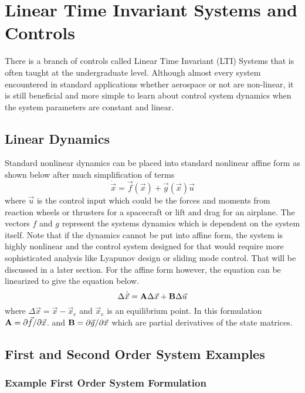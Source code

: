 \section{Linear Time Invariant Systems and Controls}

There is a branch of controls called Linear Time Invariant (LTI)
Systems that is often taught at the undergraduate level. Although
almost every system encountered in standard applications whether
aerospace or not are non-linear, it is still beneficial and more
simple to learn about control system dynamics when the system
parameters are constant and linear. 

\subsection{Linear Dynamics}

Standard nonlinear dynamics can be placed into standard
nonlinear affine form as shown below after much simplification of
terms
\begin{equation}
  \dot{\vec{x}} = \vec{f}(\vec{x}) + \vec{g}(\vec{x})\vec{u}
\end{equation}
where $\vec{u}$ is the control input which could be the forces and
moments from reaction wheels or thrusters for a spacecraft or lift and drag for an airplane. The vectors $f$ and $g$ represent the systems dynamics which is dependent on the system itself. Note that if the dynamics cannot be put into affine form, the system is highly nonlinear and the control system designed for that would require more sophisticated analysis like Lyapunov design or sliding mode control. That will be discussed in a later section. For the affine form however, the equation can be
linearized to give the equation below. 
\begin{equation}
  \Delta \dot{\vec{x}} = {\bf A}\Delta {\vec{x}} + {\bf B}\Delta \vec{u}
\end{equation}
where $\Delta \vec{x} = \vec{x} - \vec{x}_e$ and $\vec{x}_e$ is an
equilibrium point. In this formulation ${\bf A} = \partial \vec{f}/\partial \vec{x}$. and 
${\bf B} = \partial \vec{g}/\partial \vec{x}$ which are partial derivatives of the state matrices.

\subsection{First and Second Order System Examples}

\subsubsection{Example First Order System Formulation}

